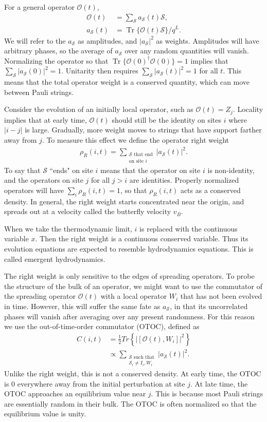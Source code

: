 \documentclass[a4paper,11pt]{article}
\renewcommand{\cal}{\mathcal}
\newcommand{\half}{\frac{1}{2}}
\newcommand{\abs}[1]{\left| #1 \right|}
\renewcommand{\S}{\mathcal{S}}
\newcommand{\nn}{\nonumber\\}
\DeclareMathOperator{\Tr}{Tr}
\begin{document}
For a general operator $\cal{O}(t)$,
\begin{align}
\cal{O}(t) &= \sum_\S a_\S(t) \S,\nn
a_\S(t) &= \Tr\{\cal{O}(t) \S \}/q^L.
\end{align}
We will refer to the $a_\S$ as amplitudes, and $\abs{a_\S}^2$ as weights. Amplitudes will have arbitrary phases, so the average of $a_\S$ over any random quantities will vanish.
Normalizing the operator so that $\Tr\{\cal{O}(0)^\dag\cal{O}(0) \}=1$ implies that $\sum_\S \abs{a_\S(0)}^2=1$. Unitarity then requires $\sum_\S \abs{a_\S(t)}^2=1$ for all $t$. This means that the total operator weight is a conserved quantity, which can move between Pauli strings.

Consider the evolution of an initially local operator, such as $\cal{O}(t)=Z_{j}$. Locality implies that at early time, $\cal{O}(t)$ should still be the identity on sites $i$ where $\abs{i-j}$ is large. Gradually, more weight moves to strings that have support farther away from $j$. To measure this effect we define the operator right weight
\begin{align}
\rho_R(i,t) = \sum_{\substack{\text{$\S$ that end}\\\text{on site $i$}}}\abs{a_\S(t)}^2.
\end{align}
To say that $\S$ ``ends" on site $i$ means that the operator on site $i$ is non-identity, and the operators on site $j$ for all $j>i$ are identities.
Properly normalized operators will have $\sum_i\rho_R(i,t)=1$, so that $\rho_R(i,t)$ acts as a conserved density. In general, the right weight starts concentrated near the origin, and spreads out at a velocity called the butterfly velocity $v_B$. 

When we take the thermodynamic limit, $i$ is replaced with the continuous variable $x$. Then the right weight is a continuous conserved variable. Thus its evolution equations are expected to resemble hydrodynamics equations. This is called emergent hydrodynamics. 

The right weight is only sensitive to the edges of spreading operators. To probe the structure of the bulk of an operator, we might want to use the commutator of the spreading operator $\cal{O}(t)$ with a local operator $W_i$ that has not been evolved in time. However, this will suffer the same fate as $a_\S$, in that its uncorrelated phases will vanish after averaging over any present randomness. For this reason we use the out-of-time-order commutator (OTOC), defined as
\begin{align}
C(i,t) &= \half Tr\left\{\abs{[\cal{O}(t), W_i]}^2\right\}\nn
&\propto \sum_{\substack{\text{$\S$ such that}\\\text{$\S_i \ne I_i, W_i$}}} \abs{a_\S(t)}^2.
\end{align}
Unlike the right weight, this is not a conserved density. At early time, the OTOC is 0 everywhere away from the initial perturbation at site $j$. At late time, the OTOC approaches an equilibrium value near $j$. This is because most Pauli strings are essentially random in their bulk. The OTOC is often normalized so that the equilibrium value is unity. 
\end{document}
